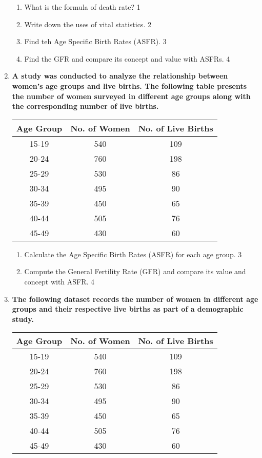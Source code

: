 \documentclass[a4paper,oneside, margin=1.4in]{book}
\begin{document}
\begin{enumerate}
  \begin{enumerate}
    \item
	What is the formula of death rate? \hfill 1
    \item
	Write down the uses of vital statistics. \hfill 2
    \item  
	Find teh Age Specific Birth Rates (ASFR). \hfill 3
    \item
	Find the GFR and compare its concept and value with ASFRs. \hfill 4
  \end{enumerate}
  
  \item
\textbf{A study was conducted to analyze the relationship between women's age groups and live births. The following table presents the number of women surveyed in different age groups along with the corresponding number of live births.} 

\begin{table}[H]
\centering
\begin{tabular}{c|c|c}
Age Group & No. of Women & No. of Live Births \\ \hline
15-19 & 540 & 109 \\ 
20-24 & 760 & 198 \\ 
25-29 & 530 & 86 \\ 
30-34 & 495 & 90 \\ 
35-39 & 450 & 65 \\ 
40-44 & 505 & 76 \\ 
45-49 & 430 & 60 
\end{tabular}
\end{table}

\begin{enumerate}
    \item
    Calculate the Age Specific Birth Rates (ASFR) for each age group. \hfill 3

    \item
    Compute the General Fertility Rate (GFR) and compare its value and concept with ASFR. \hfill 4
\end{enumerate}

\item
\textbf{The following dataset records the number of women in different age groups and their respective live births as part of a demographic study.} 

\begin{table}[H]
\centering
\begin{tabular}{c|c|c}
Age Group & No. of Women & No. of Live Births \\ \hline
15-19 & 540 & 109 \\ 
20-24 & 760 & 198 \\ 
25-29 & 530 & 86 \\ 
30-34 & 495 & 90 \\ 
35-39 & 450 & 65 \\ 
40-44 & 505 & 76 \\ 
45-49 & 430 & 60 
\end{tabular}
\end{table}


\end{enumerate}
\end{document}
